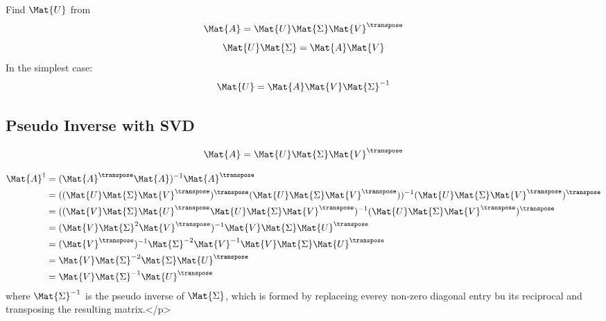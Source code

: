 \begin{enumerate}
  \begin{itemize}
    Find $\Mat{U}$ from
    \begin{equation}
      \Mat{A} = \Mat{U} \Mat{\Sigma} \Mat{V}^{\transpose}
    \end{equation}
    \begin{equation}
      \Mat{U} \Mat{\Sigma} = \Mat{A} \Mat{V}
    \end{equation}
  In the simplest case:
    \begin{equation}
      \Mat{U} = \Mat{A} \Mat{V} \Mat{\Sigma}^{-1}
    \end{equation}
  \end{itemize}
\end{enumerate}


\subsection{Pseudo Inverse with SVD}

\begin{equation}
  \Mat{A} = \Mat{U} \Mat{\Sigma} \Mat{V}^{\transpose}
\end{equation}

\begin{equation}
  \begin{aligned}
    \Mat{A}^{\dagger} &= (\Mat{A}^{\transpose} \Mat{A})^{-1} \Mat{A}^{\transpose} \\
      &= ((\Mat{U} \Mat{\Sigma} \Mat{V}^{\transpose})^{\transpose}
          (\Mat{U} \Mat{\Sigma} \Mat{V}^{\transpose}))^{-1}
        (\Mat{U} \Mat{\Sigma} \Mat{V}^{\transpose})^{\transpose} \\
      &= ((\Mat{V} \Mat{\Sigma} \Mat{U}^{\transpose}
          \Mat{U} \Mat{\Sigma} \Mat{V}^{\transpose})^{-1}
        (\Mat{U} \Mat{\Sigma} \Mat{V}^{\transpose})^{\transpose} \\
      &= (\Mat{V} \Mat{\Sigma}^{2} \Mat{V}^{\transpose})^{-1}
          \Mat{V} \Mat{\Sigma} \Mat{U}^{\transpose} \\
      &= (\Mat{V}^{\transpose})^{-1} \Mat{\Sigma}^{-2} \Mat{V}^{-1}
          \Mat{V} \Mat{\Sigma} \Mat{U}^{\transpose} \\
      &= \Mat{V} \Mat{\Sigma}^{-2} \Mat{\Sigma} \Mat{U}^{\transpose} \\
      &= \Mat{V} \Mat{\Sigma}^{-1} \Mat{U}^{\transpose} \\
  \end{aligned}
\end{equation}
where $\Mat{\Sigma}^{-1}$ is the pseudo inverse of $\Mat{\Sigma}$, which
is formed by replaceing everey non-zero diagonal entry bu its reciprocal and
transposing the resulting matrix.</p>


